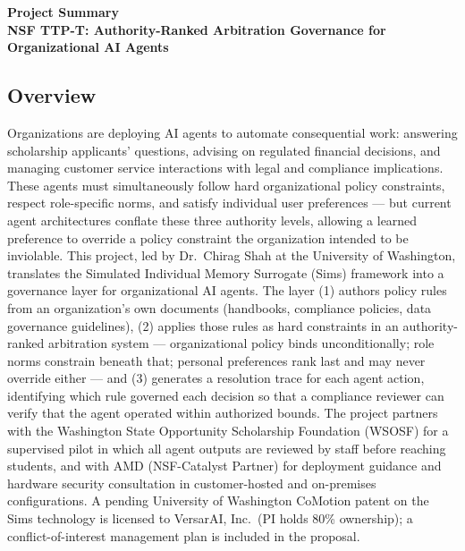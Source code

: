 \documentclass[11pt]{article}
\newcommand{\nsftitle}{NSF TTP-T: Authority-Ranked Arbitration Governance for Organizational AI Agents}
\begin{document}
\thispagestyle{fancy}

\begin{center}
  {\large\bfseries Project Summary}\\[3pt]
  {\normalsize\bfseries \nsftitle}
\end{center}
\vspace{4pt}

\subsection*{Overview}

Organizations are deploying AI agents to automate consequential work: answering scholarship applicants' questions, advising on regulated financial decisions, and managing customer service interactions with legal and compliance implications. These agents must simultaneously follow hard organizational policy constraints, respect role-specific norms, and satisfy individual user preferences --- but current agent architectures conflate these three authority levels, allowing a learned preference to override a policy constraint the organization intended to be inviolable. This project, led by Dr.\ Chirag Shah at the University of Washington, translates the Simulated Individual Memory Surrogate (Sims) framework into a governance layer for organizational AI agents. The layer (1) authors policy rules from an organization's own documents (handbooks, compliance policies, data governance guidelines), (2) applies those rules as hard constraints in an authority-ranked arbitration system --- organizational policy binds unconditionally; role norms constrain beneath that; personal preferences rank last and may never override either --- and (3) generates a resolution trace for each agent action, identifying which rule governed each decision so that a compliance reviewer can verify that the agent operated within authorized bounds. The project partners with the Washington State Opportunity Scholarship Foundation (WSOSF) for a supervised pilot in which all agent outputs are reviewed by staff before reaching students, and with AMD (NSF-Catalyst Partner) for deployment guidance and hardware security consultation in customer-hosted and on-premises configurations. A pending University of Washington CoMotion patent on the Sims technology is licensed to VersarAI, Inc.\ (PI holds 80\% ownership); a conflict-of-interest management plan is included in the proposal.
\end{document}
